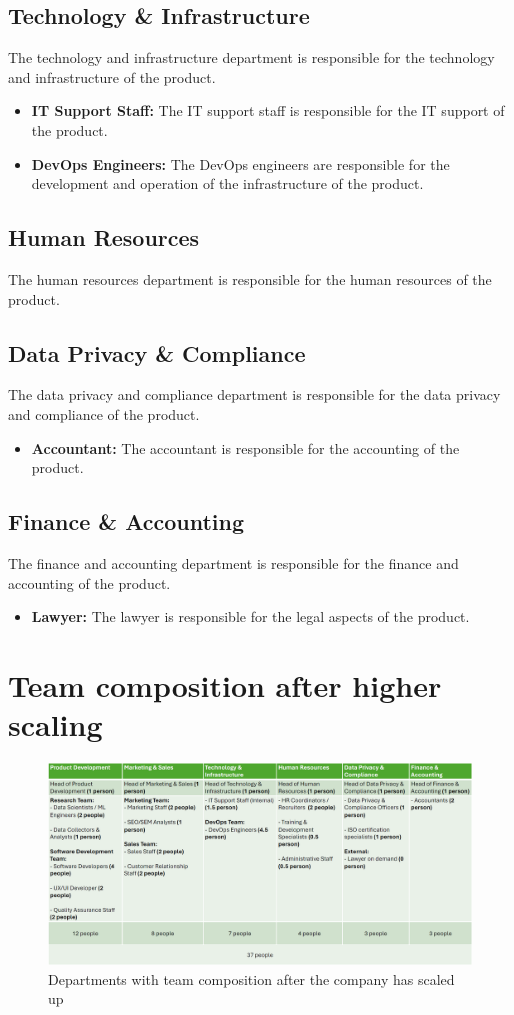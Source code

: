 \subsection{Technology \& Infrastructure}
The technology and infrastructure department is responsible for the technology and infrastructure of the product.
\begin{itemize}
    \item \textbf{IT Support Staff:} The IT support staff is responsible for the IT support of the product.
    \item \textbf{DevOps Engineers:} The DevOps engineers are responsible for the development and operation of the infrastructure of the product.
\end{itemize}

\subsection{Human Resources}
The human resources department is responsible for the human resources of the product.

\subsection{Data Privacy \& Compliance}
The data privacy and compliance department is responsible for the data privacy and compliance of the product.
\begin{itemize}
    \item \textbf{Accountant:} The accountant is responsible for the accounting of the product.
\end{itemize}

\subsection{Finance \& Accounting}
The finance and accounting department is responsible for the finance and accounting of the product.
\begin{itemize}
    \item \textbf{Lawyer:} The lawyer is responsible for the legal aspects of the product.
\end{itemize}

\section{Team composition after higher scaling}
\begin{figure}[H]
    \centering
    \includegraphics[width=\textwidth]{figures/team_comp_highscaled.png}
    \caption{Departments with team composition after the company has scaled up}
    \label{fig:team_comp_highscaled}
\end{figure}
